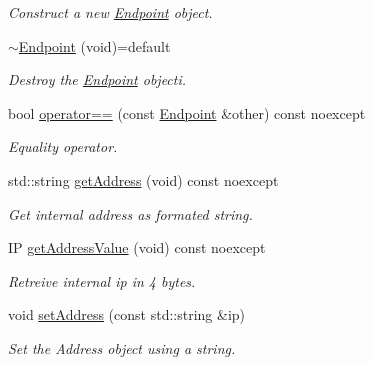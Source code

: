 \begin{DoxyCompactItemize}
\begin{DoxyCompactList}\small\item\em Construct a new \mbox{\hyperlink{classo_z_1_1_endpoint}{Endpoint}} object. \end{DoxyCompactList}\item 
\mbox{\label{classo_z_1_1_endpoint_ae48da5e193017cb119233761406e7d54}} 
\mbox{\hyperlink{classo_z_1_1_endpoint_ae48da5e193017cb119233761406e7d54}{$\sim$\+Endpoint}} (void)=default
\begin{DoxyCompactList}\small\item\em Destroy the \mbox{\hyperlink{classo_z_1_1_endpoint}{Endpoint}} objecti. \end{DoxyCompactList}\item 
\mbox{\label{classo_z_1_1_endpoint_ab5a405bf455ab2f4e28458b0ba69d399}} 
bool \mbox{\hyperlink{classo_z_1_1_endpoint_ab5a405bf455ab2f4e28458b0ba69d399}{operator==}} (const \mbox{\hyperlink{classo_z_1_1_endpoint}{Endpoint}} \&other) const noexcept
\begin{DoxyCompactList}\small\item\em Equality operator. \end{DoxyCompactList}\item 
std\+::string \mbox{\hyperlink{classo_z_1_1_endpoint_a27a680dbcdf1c89bb10fcbaca969edab}{get\+Address}} (void) const noexcept
\begin{DoxyCompactList}\small\item\em Get internal address as formated string. \end{DoxyCompactList}\item 
\mbox{\label{classo_z_1_1_endpoint_ad02055ec457231d4d0f316dcfa5539ba}} 
IP \mbox{\hyperlink{classo_z_1_1_endpoint_ad02055ec457231d4d0f316dcfa5539ba}{get\+Address\+Value}} (void) const noexcept
\begin{DoxyCompactList}\small\item\em Retreive internal ip in 4 bytes. \end{DoxyCompactList}\item 
\mbox{\label{classo_z_1_1_endpoint_a90caf5f6497ec5a09b34d7a6069502da}} 
void \mbox{\hyperlink{classo_z_1_1_endpoint_a90caf5f6497ec5a09b34d7a6069502da}{set\+Address}} (const std\+::string \&ip)
\begin{DoxyCompactList}\small\item\em Set the Address object using a string. \end{DoxyCompactList}\item 

\end{DoxyCompactItemize}
